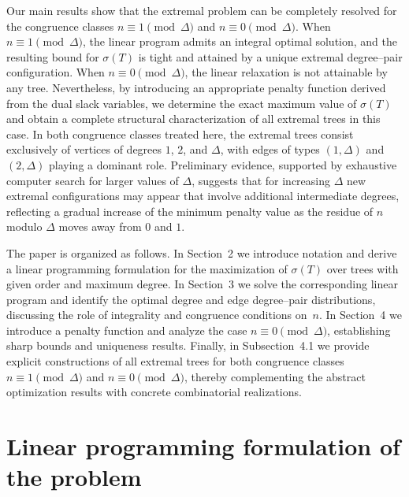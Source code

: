 \documentclass[preprint,12pt]{elsarticle}
\begin{document}
Our main results show that the extremal problem can be completely resolved for
the congruence classes $n\equiv1\pmod{\Delta}$ and $n\equiv0\pmod{\Delta}$.
When $n\equiv1\pmod{\Delta}$, the linear program admits an integral optimal
solution, and the resulting bound for $\sigma(T)$ is tight and attained by a
unique extremal degree–pair configuration.
When $n\equiv0\pmod{\Delta}$, the linear relaxation is not attainable by any tree.
Nevertheless, by introducing an appropriate penalty function derived from the
dual slack variables, we determine the exact maximum value of $\sigma(T)$ and
obtain a complete structural characterization of all extremal trees in this
case. In both congruence classes treated here, the extremal trees consist exclusively
of vertices of degrees $1$, $2$, and $\Delta$, with edges of types $(1,\Delta)$
and $(2,\Delta)$ playing a dominant role.
Preliminary evidence, supported by exhaustive computer search for larger values
of $\Delta$, suggests that for increasing $\Delta$ new extremal configurations
may appear that involve additional intermediate degrees, reflecting a gradual
increase of the minimum penalty value as the residue of $n$ modulo $\Delta$
moves away from $0$ and $1$.


The paper is organized as follows.
In Section~2 we introduce notation and derive a linear programming formulation
for the maximization of $\sigma(T)$ over trees with given order and maximum
degree.
In Section~3 we solve the corresponding linear program and identify the optimal degree and
edge degree–pair distributions, discussing the role of integrality and congruence
conditions on~$n$.
In Section~4 we introduce a penalty function and analyze the case
$n\equiv0\pmod{\Delta}$, establishing sharp bounds and uniqueness results.
Finally, in Subsection~4.1 we provide explicit constructions of all extremal trees for
both congruence classes $n\equiv1\pmod{\Delta}$ and $n\equiv0\pmod{\Delta}$,
thereby complementing the abstract optimization results with concrete
combinatorial realizations.











\section{Linear programming formulation of the problem}
\end{document}
